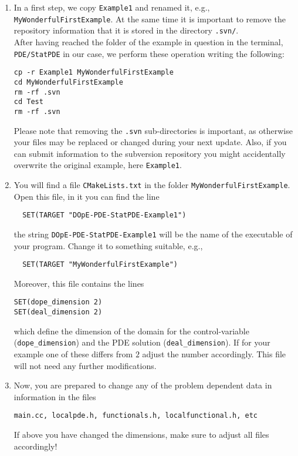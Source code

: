 \begin{enumerate}
 \item In a first step, we copy \texttt{Example1} and renamed it, e.g., 
\texttt{MyWonderfulFirstExample}. At the same time it is important to remove the repository 
information that it is stored in the directory \texttt{.svn/}. \\
After having reached the folder of the example in question in the terminal, 
\texttt{PDE/StatPDE} in our case, we perform these operation writing the following:
\begin{verbatim}
cp -r Example1 MyWonderfulFirstExample
cd MyWonderfulFirstExample
rm -rf .svn
cd Test
rm -rf .svn
\end{verbatim}
Please note that removing the \texttt{.svn} sub-directories is important,
as otherwise your files may be replaced or changed during your next
update. Also, if you can submit information to the subversion repository 
you might accidentally overwrite the original example, here \texttt{Example1}.

\item You will find a file \texttt{CMakeLists.txt} in the folder 
\texttt{MyWonderfulFirstExample}. Open this file, in it you can 
find the line 
\begin{verbatim}
  SET(TARGET "DOpE-PDE-StatPDE-Example1")
\end{verbatim}
the string \texttt{DOpE-PDE-StatPDE-Example1} will be the name of the
executable of your program. Change it to something suitable, e.g.,
\begin{verbatim}
  SET(TARGET "MyWonderfulFirstExample")
\end{verbatim}
Moreover, this file contains the lines 
\begin{verbatim}
SET(dope_dimension 2)
SET(deal_dimension 2)
\end{verbatim}
which define the dimension of the domain for the control-variable
(\texttt{dope\_dimension})
and the PDE solution (\texttt{deal\_dimension}). If for your example 
one of these differs from $2$ adjust the number accordingly.
This file will not need any further modifications.

\item  Now, you are prepared to change any of the problem
  dependent data in information in the files 
\begin{verbatim}
main.cc, localpde.h, functionals.h, localfunctional.h, etc
\end{verbatim} 
If above you have changed the dimensions, make sure to adjust all
files accordingly!


\end{enumerate}
